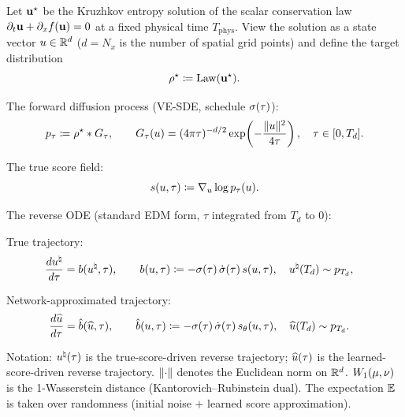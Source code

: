 
\begin{theorem}
\label{thm:stability-app}
Let $\mathbf{u}^{\star}$ be the Kruzhkov entropy solution of the scalar conservation law $\partial_{t} \mathbf{u} + \partial_{x} f(\mathbf{u}) = 0$ at a fixed physical time $T_{\mathrm{phys}}$. View the solution as a state vector $u \in \mathbb{R}^{d}$ ($d = N_{x}$ is the number of spatial grid points) and define the target distribution
\begin{equation}
\rho^{\star} \coloneqq \mathrm{Law}(\mathbf{u}^{\star}).
\label{eq:thm2-rho-star}
\end{equation}

The forward diffusion process (VE-SDE, schedule $\sigma(\tau)$):
\begin{equation}
p_{\tau} \coloneqq \rho^{\star} \ast G_{\tau}, \qquad
G_{\tau}(u) = (4\pi\tau)^{-d/2} \exp\!\left(-\frac{\lVert u \rVert^{2}}{4\tau}\right), \quad \tau \in [0, T_{d}].
\label{eq:thm2-ptau}
\end{equation}

The true score field:
\begin{equation}
s(u, \tau) \coloneqq \nabla_{u} \log p_{\tau}(u).
\label{eq:thm2-score}
\end{equation}

The reverse ODE (standard EDM form, $\tau$ integrated from $T_{d}$ to $0$):

True trajectory:
\begin{align}
\frac{du^{\natural}}{d\tau} &= b(u^{\natural}, \tau), \qquad
b(u, \tau) \coloneqq -\sigma(\tau)\,\dot\sigma(\tau)\,s(u, \tau),
\quad u^{\natural}(T_{d}) \sim p_{T_{d}},
\label{eq:thm2-reverse-true}
\end{align}

Network-approximated trajectory:
\begin{align}
\frac{d\widehat{u}}{d\tau} &= \hat b(\widehat{u}, \tau), \qquad
\hat b(u, \tau) \coloneqq -\sigma(\tau)\,\dot\sigma(\tau)\,s_{\theta}(u, \tau),
\quad \widehat{u}(T_{d}) \sim p_{T_{d}}.
\label{eq:thm2-reverse-approx}
\end{align}

Notation: $u^{\natural}(\tau)$ is the true-score-driven reverse trajectory; $\widehat{u}(\tau)$ is the learned-score-driven reverse trajectory. $\lVert \cdot \rVert$ denotes the Euclidean norm on $\mathbb{R}^{d}$. $W_{1}(\mu, \nu)$ is the 1-Wasserstein distance (Kantorovich--Rubinstein dual). The expectation $\mathbb{E}$ is taken over randomness (initial noise $+$ learned score approximation).


\end{theorem}
